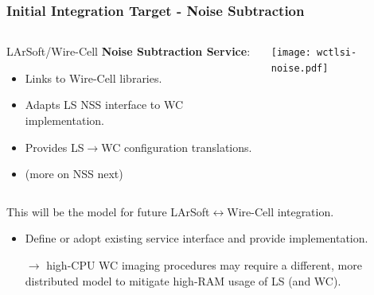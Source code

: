\documentclass[xcolor=dvipsnames]{beamer}
\begin{document}
\begin{frame}
  \frametitle{Initial Integration Target - Noise Subtraction}

  \footnotesize

  \vspace{-5mm}

  \begin{columns}
    \begin{column}{0.65\textwidth}
      LArSoft/Wire-Cell \textbf{Noise Subtraction Service}:
        \begin{itemize}\scriptsize
        \item Links to Wire-Cell libraries.
        \item Adapts LS NSS interface to WC implementation.
        \item Provides LS$\to$WC configuration translations.
        \item (more on NSS next)
        \end{itemize}
    \end{column}
    \begin{column}{0.35\textwidth}
      \texttt{[image: wctlsi-noise.pdf]}
    \end{column}
  \end{columns}

  \vfill

  This will be the model for future LArSoft$\leftrightarrow$Wire-Cell integration.
  \begin{itemize}
  \item Define or adopt existing service interface and provide implementation.
  \item[$\rightarrow$] high-CPU WC imaging procedures may require a
    different, more distributed model to mitigate high-RAM usage of LS (and WC).
  \end{itemize}

\end{frame}
\end{document}

